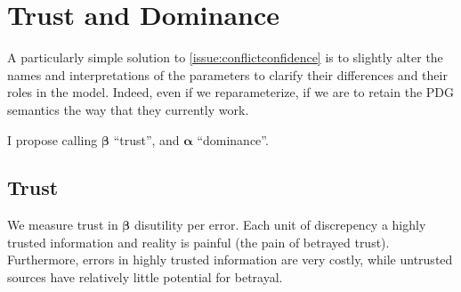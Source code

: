 \documentclass[twoside]{article} %
\theoremstyle{plain}
\theoremstyle{definition}
\newcommand{\balpha}{\boldsymbol\alpha}
\newcommand{\bbeta}{\boldsymbol\beta}
\begin{document}
    \section{Trust and Dominance}\label{sec:trust-dominance}
    A particularly simple  solution to \cref{issue:conflictconfidence} is to slightly alter the names and interpretations of the parameters to clarify their differences and their roles in the model.
    Indeed, even if we reparameterize, 
    if we are to retain the PDG semantics the way that they currently work.

    I propose calling $\bbeta$ ``trust'', and $\balpha$ ``dominance''.




    \subsection{Trust}
    We measure trust in $\bbeta$ disutility per error.
    Each unit of discrepency a highly trusted information and reality is painful (the pain of betrayed trust).
    Furthermore, errors in highly trusted information are very costly, while untrusted sources have relatively little potential for betrayal.
\end{document}
